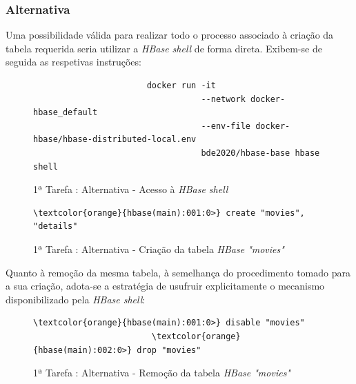 \documentclass[a4paper]{report}
\begin{document}
{			\subsubsection{Alternativa}
			Uma possibilidade válida para realizar todo o processo associado à criação da tabela requerida seria utilizar a \textit{HBase shell} de forma direta.
			Exibem-se de seguida as respetivas instruções:
			\begin{figure}[H]
				{
					\color{teal}
					\begin{verbatim}
					   docker run -it
					              --network docker-hbase_default
					              --env-file docker-hbase/hbase-distributed-local.env
					              bde2020/hbase-base hbase shell
					\end{verbatim}
				}
				\caption{1ª Tarefa : Alternativa - Acesso à \textit{HBase shell}}
				\label{fig:6}
			\end{figure}

			\begin{figure}[H]
				{
					\color{teal}
					\begin{Verbatim}[commandchars=\\\{\}]
                  \textcolor{orange}{hbase(main):001:0>} create "movies", "details"
					\end{Verbatim}
				}
				\caption{1ª Tarefa : Alternativa - Criação da tabela \textit{HBase "movies"}}
				\label{fig:7}
			\end{figure}
			
			Quanto à remoção da mesma tabela, à semelhança do procedimento tomado para a sua criação, adota-se a estratégia de usufruir explicitamente o mecanismo disponibilizado pela \textit{HBase shell}:
			\begin{figure}[H]
				{
					\color{teal}
					\begin{Verbatim}[commandchars=\\\{\}]
                        \textcolor{orange}{hbase(main):001:0>} disable "movies"
                        \textcolor{orange}{hbase(main):002:0>} drop "movies"
					\end{Verbatim}
				}
				\caption{1ª Tarefa : Alternativa - Remoção da tabela \textit{HBase "movies"}}
				\label{fig:8}
			\end{figure}

}
\end{document}
